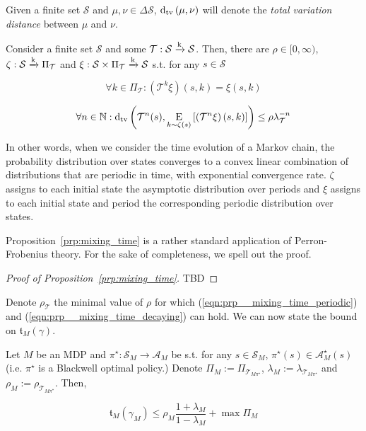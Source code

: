 \documentclass[anon,12pt]{colt2018} %
\newcommand{\AP}[1]{\left(#1\right)}
\newcommand{\AB}[1]{\left[#1\right]}
\newcommand{\Ea}[2]{\underset{#1}{\operatorname{E}}\AB{#2}}
\newcommand{\Dtva}[1]{\operatorname{d}_{\textnormal{tv}}\AP{#1}}
\newcommand{\Nats}{\mathbb{N}}
\newcommand{\K}{\xrightarrow{\textnormal{k}}}
\newcommand{\A}{\mathcal{A}}
\newcommand{\St}{\mathcal{S}}
\newcommand{\T}{\mathcal{T}}
\newcommand{\Tn}{\mathfrak{t}}
\begin{document}
Given a finite set $\St$ and $\mu,\nu \in \Delta\St$, $\Dtva{\mu,\nu}$ will denote the \emph{total variation distance} between $\mu$ and $\nu$.

\begin{samepage}
\begin{proposition}
\label{prp:mixing_time}

Consider a finite set $\St$ and some $\T: \St \K \St$. Then, there are $\rho\in[0,\infty)$, $\zeta: \St \K \Pi_\T$ and $\xi: \St \times \Pi_\T \K \St$ s.t. for any $s\in\St$

\begin{equation}
\label{eqn:prp__mixing_time_periodic}
\forall k \in \Pi_\T: \AP{\T^k\xi}(s,k) = \xi(s,k)
\end{equation}

\begin{equation}
\label{eqn:prp__mixing_time_decaying}
\forall n \in \Nats: \Dtva{\T^n(s),\Ea{k\sim\zeta(s)}{\AP{\T^n\xi}(s,k)}} \leq \rho\lambda_\T^{-n}
\end{equation}

\end{proposition}
\end{samepage}

In other words, when we consider the time evolution of a Markov chain, the probability distribution over states converges to a convex linear combination of distributions that are periodic in time, with exponential convergence rate. $\zeta$ assigns to each initial state the asymptotic distribution over periods and $\xi$ assigns to each initial state and period the corresponding periodic distribution over states.

Proposition~\ref{prp:mixing_time} is a rather standard application of Perron-Frobenius theory. For the sake of completeness, we spell out the proof.

\begin{proof}[Proof of Proposition~\ref{prp:mixing_time}]

TBD
\end{proof}

Denote $\rho_\T$ the minimal value of $\rho$ for which (\ref{eqn:prp__mixing_time_periodic}) and (\ref{eqn:prp__mixing_time_decaying}) can hold. We can now state the bound on $\Tn_M(\gamma)$.

\begin{samepage}
\begin{proposition}
\label{prp:transient}

Let $M$ be an MDP and $\pi^\star: \St_M \rightarrow \A_M$ be s.t. for any $s \in \St_M$, $\pi^\star(s)\in\A_M^\star(s)$ (i.e. $\pi^\star$ is a Blackwell optimal policy.) Denote $\Pi_M:=\Pi_{\T_{M\pi^\star}}$, $\lambda_M:=\lambda_{\T_{M\pi^\star}}$ and $\rho_M:=\rho_{\T_{M\pi^\star}}$. Then,

\begin{equation}
\Tn_M\AP{\gamma_M} \leq \rho_M \frac{1+\lambda_M}{1-\lambda_M} + \max{\Pi_M}
\end{equation}

\end{proposition}
\end{samepage}
\end{document}
